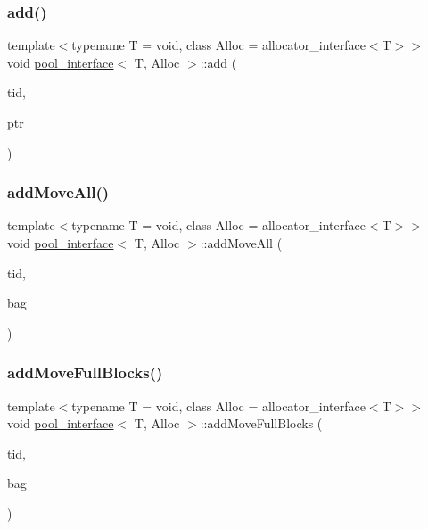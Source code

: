 \subsubsection{\texorpdfstring{add()}{add()}}
{\footnotesize\ttfamily template$<$typename T  = void, class Alloc  = allocator\+\_\+interface$<$\+T$>$$>$ \\
void \hyperlink{classpool__interface}{pool\+\_\+interface}$<$ T, Alloc $>$\+::add (\begin{DoxyParamCaption}\item[{const int}]{tid,  }\item[{T $\ast$}]{ptr }\end{DoxyParamCaption})\hspace{0.3cm}{\ttfamily [inline]}}

\mbox{\label{classpool__interface_a58093f6826bc44855b9323e91aa3de7a}} 
\subsubsection{\texorpdfstring{add\+Move\+All()}{addMoveAll()}}
{\footnotesize\ttfamily template$<$typename T  = void, class Alloc  = allocator\+\_\+interface$<$\+T$>$$>$ \\
void \hyperlink{classpool__interface}{pool\+\_\+interface}$<$ T, Alloc $>$\+::add\+Move\+All (\begin{DoxyParamCaption}\item[{const int}]{tid,  }\item[{\hyperlink{classblockbag}{blockbag}$<$ T $>$ $\ast$}]{bag }\end{DoxyParamCaption})\hspace{0.3cm}{\ttfamily [inline]}}

\mbox{\label{classpool__interface_afb8890cc6f5228695c06c77ecd70029a}} 
\subsubsection{\texorpdfstring{add\+Move\+Full\+Blocks()}{addMoveFullBlocks()}}
{\footnotesize\ttfamily template$<$typename T  = void, class Alloc  = allocator\+\_\+interface$<$\+T$>$$>$ \\
void \hyperlink{classpool__interface}{pool\+\_\+interface}$<$ T, Alloc $>$\+::add\+Move\+Full\+Blocks (\begin{DoxyParamCaption}\item[{const int}]{tid,  }\item[{\hyperlink{classblockbag}{blockbag}$<$ T $>$ $\ast$}]{bag }\end{DoxyParamCaption})\hspace{0.3cm}{\ttfamily [inline]}}

